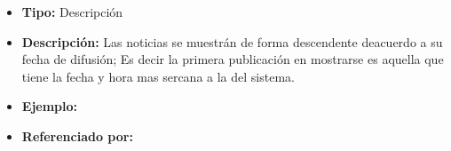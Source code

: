 \begin{itemize}
  \item \textbf{Tipo:} Descripción
  \item \textbf{Descripción:} Las noticias se muestrán de forma descendente deacuerdo a su fecha de difusión; Es decir la primera publicación en mostrarse es aquella que tiene la fecha y hora mas sercana a la del sistema.
  \item \textbf{Ejemplo:} 
  \item \textbf{Referenciado por:}  \\
\end{itemize}


